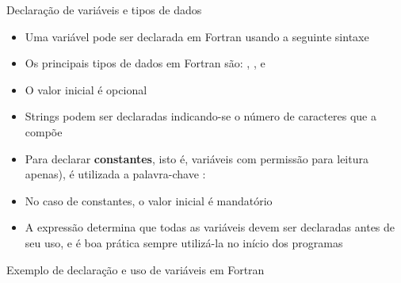 \begin{frame}[fragile]{Declaração de variáveis e tipos de dados}

    \begin{itemize}
        \item Uma variável pode ser declarada em Fortran usando a seguinte sintaxe


        \item Os principais tipos de dados em Fortran são: , 
            ,  e 
        
        \item O valor inicial é opcional

        \item Strings podem ser declaradas indicando-se o número de caracteres que a compõe


        \item Para declarar \textbf{constantes}, isto é, variáveis com permissão para leitura
            apenas), é utilizada a palavra-chave :

    
        \item No caso de constantes, o valor inicial é mandatório

        \item A expressão  determina que todas as variáveis devem
            ser declaradas antes de seu uso, e é boa prática sempre utilizá-la no início dos
            programas
    \end{itemize}

\end{frame}

\begin{frame}[fragile]{Exemplo de declaração e uso de variáveis em Fortran}
\end{frame}

